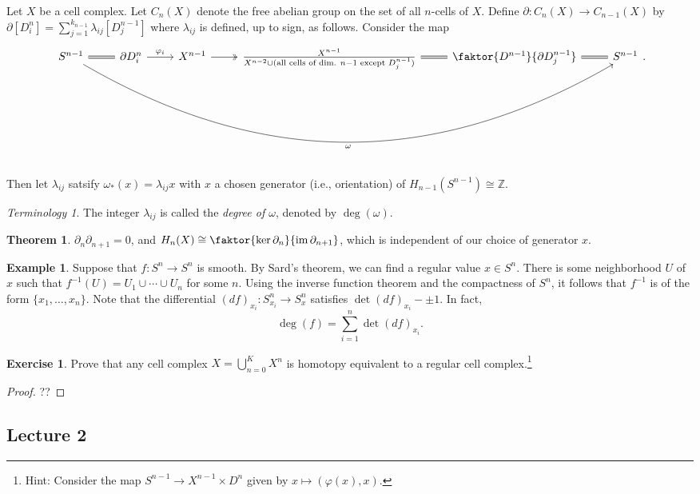 \documentclass[10pt,letterpaper,cm]{nupset}
\theoremstyle{definition}
\newtheorem{exmp}[defn]{Example}
\theoremstyle{theorem}
\newtheorem{theorem}[defn]{Theorem}
\newtheorem{exercise}[defn]{Exercise}
\theoremstyle{remark}
\newtheorem*{term}{Terminology}
\newcommand{\Z}{\mathbb Z}
\newcommand{\1}{\mathbb{1}}
\newcommand{\0}{\vec 0}
\DeclareMathOperator{\im}{im}
\begin{document}
Let $X$ be a cell complex. Let $C_n(X)$ denote the free abelian group on the set of all $n$-cells of $X$. Define $\partial : C_n(X) \to C_{n-1}(X)$ by $\partial[D_i^n] = \sum_{j=1}^{k_{n-1}} \lambda_{ij}[D_j^{n-1}]$ where $\lambda_{ij}$ is defined, up to sign, as follows. Consider the map
\[
\begin{tikzcd}
S^{n-1} \arrow[r, equals] \arrow[rrrrr, "\omega"', bend right] & \partial{D_i^n} \arrow[r, "\varphi_i"] & X^{n-1} \arrow[r, two heads] & \frac{X^{n-1}}{X^{n-2} \cup (\text{all cells of dim. } n-1 \text{ except } D_j^{n-1})} \arrow[r, equals] & \faktor{D^{n-1}}{\partial{D_j^{n-1}}} \arrow[r, equals] & S^{n-1}
\end{tikzcd}
.\]
 Then let $\lambda_{ij}$ satsify $\omega_{\ast}(x) = \lambda_{ij}x$ with $x$ a chosen generator (i.e., orientation) of $H_{n-1}(S^{n-1}) \cong \Z$. 

\begin{term}
The integer $\lambda_{ij}$ is called the \textit{degree of $\omega$}, denoted by $\deg(\omega)$.
\end{term}

\begin{theorem}
$\partial_n{\partial_{n+1}} = 0$, and $H_n(X) \cong \faktor{\ker{\partial_n}}{\im{\partial_{n+1}}}$, which is independent of our choice of generator $x$.
\end{theorem}

\begin{exmp}
Suppose that $f: S^n \to S^n$ is smooth. By Sard's theorem, we can find a regular value $x \in S^n$. There is some neighborhood $U$ of $x$ such that $f^{-1}(U) = U_1 \cup \cdots \cup U_n$ for some $n$. Using the inverse function theorem and the compactness of $S^n$, it follows that $f^{-1}$ is of the form $\{x_1, \ldots, x_n\}$. Note that the differential $(d{f})_{x_i} : S^n_{x_i} \to S^n_x$ satisfies $\det{(d{f})_{x_i}} - \pm 1$. In fact, $$\deg(f) = \sum_{i=1}^n \det{(d{f})_{x_i}}.$$
\end{exmp}

\begin{exercise}\label{reg}
Prove that any cell complex $X= \bigcup_{n=0}^KX^n$ is homotopy equivalent to a regular cell complex.\footnote{Hint: Consider the map $S^{n-1} \to X^{n-1} \times D^n$ given by $x \mapsto (\varphi(x), x)$.}
\end{exercise}
\begin{proof}
??
\end{proof}

\subsection{Lecture 2}
\end{document}
